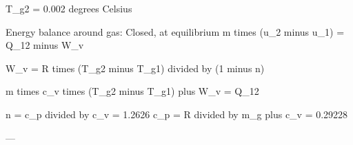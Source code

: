 T_g2 = 0.002 degrees Celsius  

Energy balance around gas: Closed, at equilibrium  
m times (u_2 minus u_1) = Q_12 minus W_v  

W_v = R times (T_g2 minus T_g1) divided by (1 minus n)  

m times c_v times (T_g2 minus T_g1) plus W_v = Q_12  

n = c_p divided by c_v = 1.2626  
c_p = R divided by m_g plus c_v = 0.29228  

---